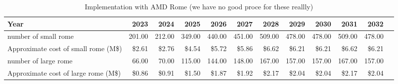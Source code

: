 \tiny \begin{longtable} { |p{}  |r  |r  |r  |r  |r  |r  |r  |r  |r  |r  |r |} 
\caption{Implementation with AMD Rome (we have no good proce for these reallly) \label{tab:opsRome}}\\ 
\hline 
\textbf{Year}&\textbf{2023}&\textbf{2024}&\textbf{2025}&\textbf{2026}&\textbf{2027}&\textbf{2028}&\textbf{2029}&\textbf{2030}&\textbf{2031}&\textbf{2032} \\ \hline
{number of small rome }&{201.00}&{212.00}&{349.00}&{440.00}&{451.00}&{509.00}&{478.00}&{478.00}&{509.00}&{478.00} \\ \hline
{Approximate cost of small rome (M\$)}&{\$2.61}&{\$2.76}&{\$4.54}&{\$5.72}&{\$5.86}&{\$6.62}&{\$6.21}&{\$6.21}&{\$6.62}&{\$6.21} \\ \hline
{number of large rome }&{66.00}&{70.00}&{115.00}&{144.00}&{148.00}&{167.00}&{157.00}&{157.00}&{167.00}&{157.00} \\ \hline
{Approximate cost of large rome (M\$)}&{\$0.86}&{\$0.91}&{\$1.50}&{\$1.87}&{\$1.92}&{\$2.17}&{\$2.04}&{\$2.04}&{\$2.17}&{\$2.04} \\ \hline
\end{longtable} \normalsize
